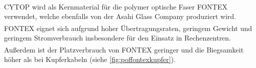 CYTOP\textsuperscript{\texttrademark} wird als Kernmaterial für die polymer
optische Faser FONTEX\textsuperscript{\texttrademark} verwendet, welche
ebenfalls von der Asahi Glass Company produziert wird.
FONTEX\textsuperscript{\texttrademark} eignet sich aufgrund hoher
Übertragungsraten, geringem Gewicht und geringem Stromverbrauch insbesondere für
den Einsatz in Rechenzentren. Außerdem ist der Platzverbrauch von
FONTEX\textsuperscript{\texttrademark} geringer und die Biegsamkeit höher als
bei Kupferkabeln (siehe \autoref{fig:poffontexkupfer}). \cite{poffontex}
